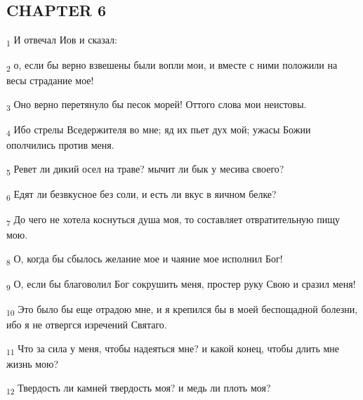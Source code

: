 \subsection{CHAPTER 6}
\begin{tcolorbox}
\textsubscript{1} И отвечал Иов и сказал:
\end{tcolorbox}
\begin{tcolorbox}
\textsubscript{2} о, если бы верно взвешены были вопли мои, и вместе с ними положили на весы страдание мое!
\end{tcolorbox}
\begin{tcolorbox}
\textsubscript{3} Оно верно перетянуло бы песок морей! Оттого слова мои неистовы.
\end{tcolorbox}
\begin{tcolorbox}
\textsubscript{4} Ибо стрелы Вседержителя во мне; яд их пьет дух мой; ужасы Божии ополчились против меня.
\end{tcolorbox}
\begin{tcolorbox}
\textsubscript{5} Ревет ли дикий осел на траве? мычит ли бык у месива своего?
\end{tcolorbox}
\begin{tcolorbox}
\textsubscript{6} Едят ли безвкусное без соли, и есть ли вкус в яичном белке?
\end{tcolorbox}
\begin{tcolorbox}
\textsubscript{7} До чего не хотела коснуться душа моя, то составляет отвратительную пищу мою.
\end{tcolorbox}
\begin{tcolorbox}
\textsubscript{8} О, когда бы сбылось желание мое и чаяние мое исполнил Бог!
\end{tcolorbox}
\begin{tcolorbox}
\textsubscript{9} О, если бы благоволил Бог сокрушить меня, простер руку Свою и сразил меня!
\end{tcolorbox}
\begin{tcolorbox}
\textsubscript{10} Это было бы еще отрадою мне, и я крепился бы в моей беспощадной болезни, ибо я не отвергся изречений Святаго.
\end{tcolorbox}
\begin{tcolorbox}
\textsubscript{11} Что за сила у меня, чтобы надеяться мне? и какой конец, чтобы длить мне жизнь мою?
\end{tcolorbox}
\begin{tcolorbox}
\textsubscript{12} Твердость ли камней твердость моя? и медь ли плоть моя?
\end{tcolorbox}
